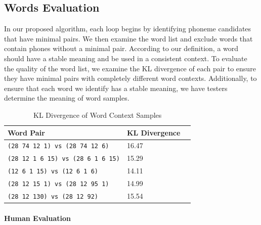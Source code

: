 \subsection{Words Evaluation}

In our proposed algorithm, each loop begins by identifying phoneme candidates that have minimal pairs. We then examine the word list and exclude words that contain phones without a minimal pair. According to our definition, a word should have a stable meaning and be used in a consistent context. To evaluate the quality of the word list, we examine the KL divergence of each pair to ensure they have minimal pairs with completely different word contexts. Additionally, to ensure that each word we identify has a stable meaning, we have testers determine the meaning of word samples.

\begin{table}[th]
\centering
\small
\begin{tabular}{lll}
\hline
\textbf{Word Pair} & \textbf{KL Divergence}\\
\hline
\verb|(28 74 12 1) vs (28 74 12 6)| & 16.47  \\
\verb|(28 12 1 6 15) vs (28 6 1 6 15)| & 15.29 \\
\verb|(12 6 1 15) vs (12 6 1 6)| & 14.11 \\
\verb|(28 12 15 1) vs (28 12 95 1)| & 14.99 \\
\verb|(28 12 130) vs (28 12 92)| &15.54 \\\hline
\end{tabular}
\caption{KL Divergence of Word Context Samples}
\label{tab:kld}
\end{table}



\paragraph{Human Evaluation}

